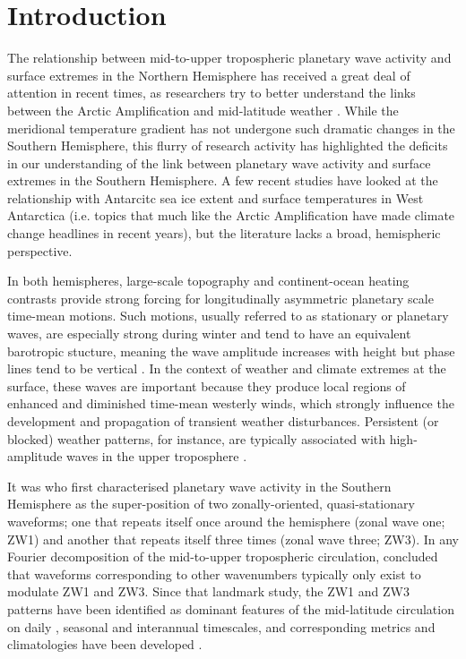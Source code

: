 \section{Introduction}\label{s:introduction}

The relationship between mid-to-upper tropospheric planetary wave activity and surface extremes in the Northern Hemisphere has received a great deal of attention in recent times, as researchers try to better understand the links between the Arctic Amplification and mid-latitude weather \citep[e.g.][]{Cohen2014,Screen2014}. While the meridional temperature gradient has not undergone such dramatic changes in the Southern Hemisphere, this flurry of research activity has highlighted the deficits in our understanding of the link between planetary wave activity and surface extremes in the Southern Hemisphere. A few recent studies have looked at the relationship with Antarcitc sea ice extent \citep{Raphael2007,Raphael2014} and surface temperatures in West Antarctica \citep{Ding2011,Ding2013} (i.e. topics that much like the Arctic Amplification have made climate change headlines in recent years), but the literature lacks a broad, hemispheric perspective. 

In both hemispheres, large-scale topography and continent-ocean heating contrasts provide strong forcing for longitudinally asymmetric planetary scale time-mean motions. Such motions, usually referred to as stationary or planetary waves, are especially strong during winter and tend to have an equivalent barotropic stucture, meaning the wave amplitude increases with height but phase lines tend to be vertical \citep{Holton2013}. In the context of weather and climate extremes at the surface, these waves are important because they produce local regions of enhanced and diminished time-mean westerly winds, which strongly influence the development and propagation of transient weather disturbances. Persistent (or blocked) weather patterns, for instance, are typically associated with high-amplitude waves in the upper troposphere \citep[e.g.][]{Trenberth1985,Renwick2005}.

It was \citet{vanLoon1972} who first characterised planetary wave activity in the Southern Hemisphere as the super-position of two zonally-oriented, quasi-stationary waveforms; one that repeats itself once around the hemisphere (zonal wave one; ZW1) and another that repeats itself three times (zonal wave three; ZW3). In any Fourier decomposition of the mid-to-upper tropospheric circulation, \citet{vanLoon1972} concluded that waveforms corresponding to other wavenumbers typically only exist to modulate ZW1 and ZW3. Since that landmark study, the ZW1 and ZW3 patterns have been identified as dominant features of the mid-latitude circulation on daily \citep[e.g.][]{Kidson1988}, seasonal \citep[e.g.][]{Mo1985} and interannual \citep[e.g.][]{Karoly1989} timescales, and corresponding metrics and climatologies have been developed \citep{Raphael2004,Hobbs2007}.

